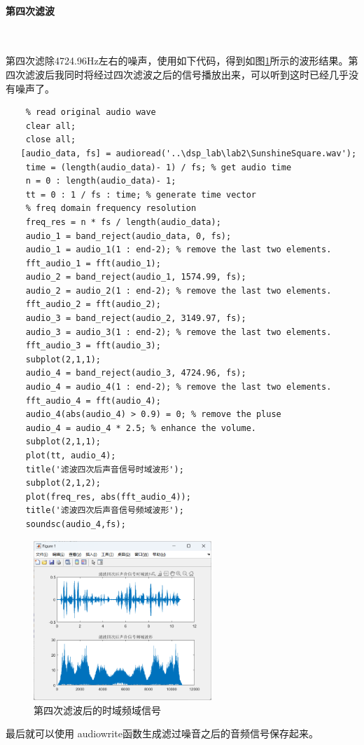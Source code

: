 \documentclass[UTF8]{ctexart}
\begin{document}
\paragraph{第四次滤波}~{}\par
第四次滤除4724.96Hz左右的噪声，使用如下代码，得到如图\ref{img:5}所示的波形结果。第四次滤波后我同时将经过四次滤波之后的信号播放出来，可以听到这时已经几乎没有噪声了。
\begin{verbatim}
    % read original audio wave
    clear all;
    close all;
   [audio_data, fs] = audioread('..\dsp_lab\lab2\SunshineSquare.wav');
    time = (length(audio_data)- 1) / fs; % get audio time
    n = 0 : length(audio_data)- 1;
    tt = 0 : 1 / fs : time; % generate time vector
    % freq domain frequency resolution
    freq_res = n * fs / length(audio_data);
    audio_1 = band_reject(audio_data, 0, fs);
    audio_1 = audio_1(1 : end-2); % remove the last two elements.
    fft_audio_1 = fft(audio_1);
    audio_2 = band_reject(audio_1, 1574.99, fs);
    audio_2 = audio_2(1 : end-2); % remove the last two elements.
    fft_audio_2 = fft(audio_2);
    audio_3 = band_reject(audio_2, 3149.97, fs);
    audio_3 = audio_3(1 : end-2); % remove the last two elements.
    fft_audio_3 = fft(audio_3);
    subplot(2,1,1);
    audio_4 = band_reject(audio_3, 4724.96, fs);
    audio_4 = audio_4(1 : end-2); % remove the last two elements.
    fft_audio_4 = fft(audio_4);
    audio_4(abs(audio_4) > 0.9) = 0; % remove the pluse
    audio_4 = audio_4 * 2.5; % enhance the volume.
    subplot(2,1,1);
    plot(tt, audio_4);
    title('滤波四次后声音信号时域波形');
    subplot(2,1,2);
    plot(freq_res, abs(fft_audio_4));
    title('滤波四次后声音信号频域波形');
    soundsc(audio_4,fs);   
\end{verbatim}
\begin{figure}[htbp]
    \centering
    \includegraphics[width=0.6\textwidth]{5.png}
    \caption{第四次滤波后的时域频域信号}
    \label{img:5}
\end{figure}
最后就可以使用 audiowrite函数生成滤过噪音之后的音频信号保存起来。
\end{document}
